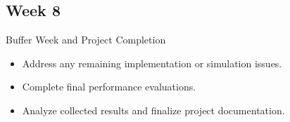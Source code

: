 \documentclass[conference]{IEEEtran}
\begin{document}
\subsection*{Week 8}
Buffer Week and Project Completion
\begin{itemize}
\item{Address any remaining implementation or simulation issues.}
\item{Complete final performance evaluations.}
\item{Analyze collected results and finalize project documentation.}
\end{itemize}
\nocite{deshpande2016microsurgical}


\end{document}
